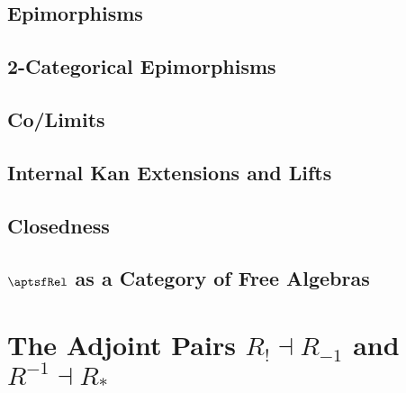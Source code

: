 \subsection{Epimorphisms}\label{subsection-epimorphisms-in-rel-apartness}
\subsection{2-Categorical Epimorphisms}\label{subsection-2-categorical-epimorphisms-in-rel-apartness}
\subsection{Co/Limits}\label{subsection-co-limits-in-rel-apartness}
\subsection{Internal Kan Extensions and Lifts}\label{subsection-internal-kan-extensions-and-lifts-in-rel-apartness}
\subsection{Closedness}\label{subsection-closedness-of-rel-apartness}
\subsection{$\aptsfRel$ as a Category of Free Algebras}\label{subsection-rel-apartness-as-a-category-of-free-algebras}
\section{The Adjoint Pairs $R_{!}\dashv R_{-1}$ and $R^{-1}\dashv R_{*}$}\label{section-the-adjoint-pairs-r-shriek-r-minus-one-and-r-minus-one-r-star}
